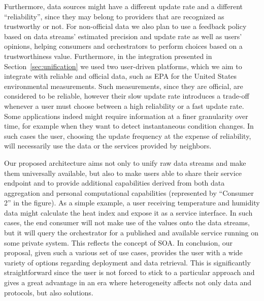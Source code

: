 Furthermore, data sources might have a different update rate and a different ``reliability'', since they may belong to providers that are recognized as trustworthy or not.
For non-official data we also plan to use a feedback policy based on data streams' estimated precision and update rate as well as users' opinions, helping consumers and orchestrators to perform choices based on a trustworthiness value. 
Furthermore, in the integration presented in Section~\ref{sec:unification} we used two user-driven platforms, which we aim to integrate with reliable and official data, such as EPA for the United States environmental measurements.
Such measurements, since they are official, are considered to be reliable, however their slow update rate introduces a trade-off whenever a user must choose between a high reliability or a fast update rate.
Some applications indeed might require information at a finer granularity over time, for example when they want to detect instantaneous condition changes.
In such cases the user, choosing the update frequency at the expense of reliability, will necessarily use the data or the services provided by neighbors.

Our proposed architecture aims not only to unify raw data streams and make them universally available, but also to make users able to share their service endpoint and to provide additional capabilities derived from both data aggregation and personal computational capabilities (represented by ``Consumer 2'' in the figure).
As a simple example, a user receiving temperature and humidity data might calculate the heat index and expose it as a service interface.
In such cases, the end consumer will not make use of the values onto the data streams, but it will query the orchestrator for a published and available service running on some private system.
This reflects the concept of SOA.
In conclusion, our proposal, given such a various set of use cases, provides the user with a wide variety of options regarding deployment and data retrieval.
This is significantly straightforward since the user is not forced to stick to a particular approach and gives a great advantage in an era where heterogeneity affects not only data and protocols, but also solutions.
